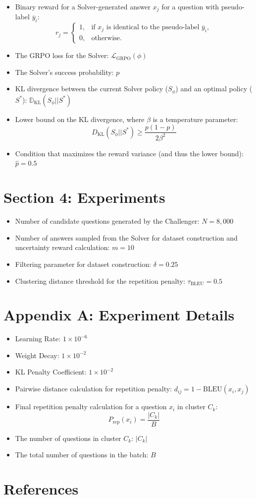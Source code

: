 \documentclass{article}
\begin{document}
\begin{itemize}
    \item Binary reward for a Solver-generated answer $x_j$ for a question with pseudo-label $\overline{y}_{i}$:
        $$r_j = \begin{cases} 1, & \text{if } x_j \text{ is identical to the pseudo-label } \overline{y}_{i}, \\ 0, & \text{otherwise.} \end{cases}$$
    \item The GRPO loss for the Solver: $\mathcal{L}_{\text{GRPO}}(\phi)$
    \item The Solver's success probability: $p$
    \item KL divergence between the current Solver policy ($S_{\phi}$) and an optimal policy ($S^{*}$): $\mathbb{D}_{\text{KL}}(S_{\phi}||S^{*})$
    \item Lower bound on the KL divergence, where $\beta$ is a temperature parameter:
        $$D_{\text{KL}}(S_{\phi}||S^{*}) \geq \frac{p(1-p)}{2\beta^2}$$
    \item Condition that maximizes the reward variance (and thus the lower bound): $\hat{p}=0.5$
\end{itemize}

\section*{Section 4: Experiments}

\begin{itemize}
    \item Number of candidate questions generated by the Challenger: $N=8,000$
    \item Number of answers sampled from the Solver for dataset construction and uncertainty reward calculation: $m=10$
    \item Filtering parameter for dataset construction: $\delta=0.25$
    \item Clustering distance threshold for the repetition penalty: $\tau_{\text{BLEU}}=0.5$
\end{itemize}

\section*{Appendix A: Experiment Details}

\begin{itemize}
    \item Learning Rate: $1\times10^{-6}$
    \item Weight Decay: $1\times10^{-2}$
    \item KL Penalty Coefficient: $1\times10^{-2}$
    \item Pairwise distance calculation for repetition penalty: $d_{ij}=1-\text{BLEU}(x_{i},x_{j})$
    \item Final repetition penalty calculation for a question $x_i$ in cluster $C_k$:
        $$P_{\text{rep}}(x_i) = \frac{|C_k|}{B}$$
    \item The number of questions in cluster $C_k$: $|C_{k}|$
    \item The total number of questions in the batch: $B$
\end{itemize}

\section*{References}



\end{document}
